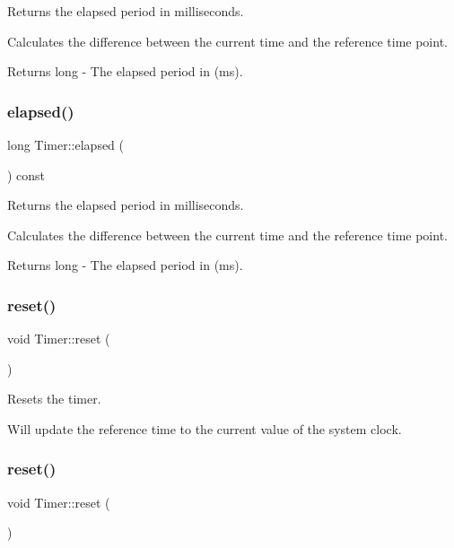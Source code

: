 Returns the elapsed period in milliseconds. 

Calculates the difference between the current time and the reference time point.

\begin{DoxyReturn}{Returns}
long -\/ The elapsed period in (ms). 
\end{DoxyReturn}
\mbox{\label{classTimer_aa6e8575043cd8cd45754786e2f714c9a}} 
\subsubsection{\texorpdfstring{elapsed()}{elapsed()}\hspace{0.1cm}{\footnotesize\ttfamily [2/2]}}
{\footnotesize\ttfamily long Timer\+::elapsed (\begin{DoxyParamCaption}{ }\end{DoxyParamCaption}) const}



Returns the elapsed period in milliseconds. 

Calculates the difference between the current time and the reference time point.

\begin{DoxyReturn}{Returns}
long -\/ The elapsed period in (ms). 
\end{DoxyReturn}
\mbox{\label{classTimer_a9020542d73357a4eef512eefaf57524b}} 
\subsubsection{\texorpdfstring{reset()}{reset()}\hspace{0.1cm}{\footnotesize\ttfamily [1/2]}}
{\footnotesize\ttfamily void Timer\+::reset (\begin{DoxyParamCaption}{ }\end{DoxyParamCaption})}



Resets the timer. 

Will update the reference time to the current value of the system clock. \mbox{\label{classTimer_a9020542d73357a4eef512eefaf57524b}} 
\subsubsection{\texorpdfstring{reset()}{reset()}\hspace{0.1cm}{\footnotesize\ttfamily [2/2]}}
{\footnotesize\ttfamily void Timer\+::reset (\begin{DoxyParamCaption}{ }\end{DoxyParamCaption})}



